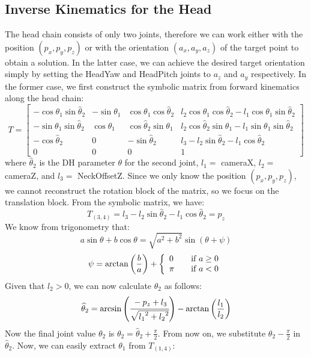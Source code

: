 \subsection{Inverse Kinematics for the Head}
The head chain consists of only two joints, therefore we can work either with the position $(p_x,p_y,p_z)$ or with the orientation $(a_x,a_y,a_z)$ of the target point to obtain a solution. In the latter case, we can achieve the desired target orientation simply by setting the HeadYaw and HeadPitch joints to $a_z$ and $a_y$ respectively. In the former case, we first construct the symbolic matrix from forward kinematics along the head chain:
\[
T = 
\begin{bmatrix}
-\cos\theta_1\sin\widehat{\theta}_2 & -\sin\theta_1 & \cos\theta_1\cos\widehat{\theta}_2 &  l_2\cos\theta_1\cos\widehat{\theta}_2 - l_1\cos\theta_1\sin\widehat{\theta}_2\\
-\sin\theta_1\sin\widehat{\theta}_2 & \cos\theta_1 & \cos\widehat{\theta}_2\sin\theta_1 & l_2\cos\widehat{\theta}_2\sin\theta_1 - l_1\sin\theta_1\sin\widehat{\theta}_2\\
-\cos\widehat{\theta}_2 & 0 & -\sin\widehat{\theta}_2 & l_3 - l_2\sin\widehat{\theta}_2 - l_1\cos\widehat{\theta}_2\\
0 & 0 & 0 & 1
\end{bmatrix}
\]
where $\widehat{\theta}_2$ is the DH parameter $\theta$ for the second joint, $l_1 =$ cameraX, $l_2 =$ cameraZ, and $l_3 =$ NeckOffsetZ.
Since we only know the position $(p_x,p_y,p_z)$, we cannot reconstruct the rotation block of the matrix, so we focus on the translation block. From the symbolic matrix, we have: 
\[
T_{(3,4)} = l_3 - l_2\sin\widehat{\theta}_2 - l_1\cos\widehat{\theta}_2 = p_z
\]
We know from trigonometry that: 
\[
a\sin\theta + b\cos\theta = \sqrt{a^2+b^2}\sin\left(\theta + \psi\right)
\]
\[
\psi=\arctan\left(\frac{b}{a}\right) + \left\{ 
  \begin{array}{l l}
    0 & \quad \text{if }a\geq0\\
    \pi & \quad \text{if }a<0\\
  \end{array} \right.
\]
Given that $l_2>0$, we can now calculate $\widehat{\theta}_2$ as follows:
\[
\widehat{\theta}_2 = \arcsin\left(\cfrac{-p_z+l_3}{\sqrt{{l_1}^2+{l_2}^2}}\right) - \arctan\left(\frac{l_1}{l_2}\right)
\]
Now the final joint value $\theta_2$ is $\theta_2 = \widehat{\theta}_2 + \frac{\pi}{2}$.  From now on, we substitute $\theta_2 - \frac{\pi}{2}$ in $\widehat{\theta}_2$. Now, we can easily extract $\theta_1$ from $T_{(1,4)}$:
